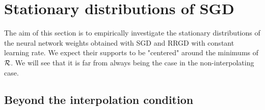 \section{Stationary distributions of SGD}
\label{section_stationary}

The aim of this section is to empirically investigate the stationary distributions of the neural network weights obtained with SGD and RRGD with constant learning rate. 
We expect their supports to be "centered" around the minimums of $\mathcal{R}$. We will see that it is far from always being the case in the non-interpolating case. 

\subsection{Beyond the interpolation condition}
\label{subsection_beyond_interpolation}


